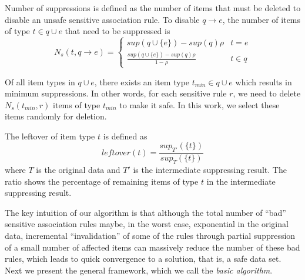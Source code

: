 \begin{definition}
\label{minimum}
Number of suppressions is defined as the number of items that must be
deleted to disable an unsafe sensitive association rule.
To disable $q \rightarrow e$, the number of items of type
$t \in q\cup e$ that need to be suppressed is
\[N_s(t, q\rightarrow e)=
\begin{cases}
sup(q\cup \{e\})-sup(q)\rho & t=e  \\
\frac{sup(q\cup \{e\})-sup(q)\rho}{1-\rho} & t\in q %
\end{cases} \]
\end{definition}

Of all item types in $q\cup e$, there exists an item type $t_{min} \in q\cup
e$ which results in minimum suppressions. In other words, for each
sensitive rule $r$, we need to delete $N_s(t_{min}, r)$ items of type
$t_{min}$ to make it safe. In this work, we select these items randomly
for deletion.

\begin{definition}
 The leftover of item type $t$ is defined as
\[ leftover(t)=\frac{sup_{T'}(\{t\})}{sup_T(\{t\})} \]
where $T$ is the original data and $T'$ is the intermediate suppressing result.
The ratio shows the percentage of remaining items of type $t$
in the intermediate suppressing result.
\end{definition}


The key intuition of our algorithm is that although the total number of
``bad'' sensitive association rules
maybe, in the worst case, exponential in the original data, incremental
``invalidation'' of some of the rules through partial suppression of a
small number of affected items can massively reduce the number of these bad
rules, which leads to quick convergence to a solution, that is, a
safe data set.
%
Next we present the general framework, which we call the {\em basic
algorithm}.

